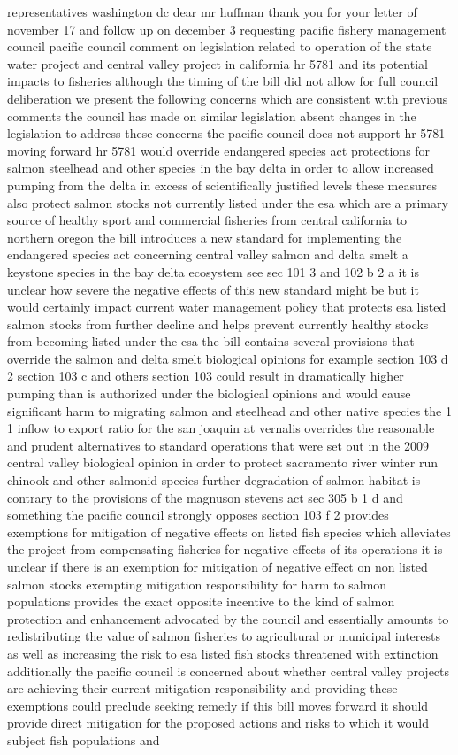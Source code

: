 \documentclass{article}
\begin{document}
representatives washington dc dear mr huffman thank you for your letter of november 17 and follow up on december 3 requesting pacific fishery management council pacific council comment on legislation related to operation of the state water project and central valley project in california hr 5781 and its potential impacts to fisheries although the timing of the bill did not allow for full council deliberation we present the following concerns which are consistent with previous comments the council has made on similar legislation absent changes in the legislation to address these concerns the pacific council does not support hr 5781 moving forward hr 5781 would override endangered species act protections for salmon steelhead and other species in the bay delta in order to allow increased pumping from the delta in excess of scientifically justified levels these measures also protect salmon stocks not currently listed under the esa which are a primary source of healthy sport and commercial fisheries from central california to northern oregon the bill introduces a new standard for implementing the endangered species act concerning central valley salmon and delta smelt a keystone species in the bay delta ecosystem see sec 101 3 and 102 b 2 a it is unclear how severe the negative effects of this new standard might be but it would certainly impact current water management policy that protects esa listed salmon stocks from further decline and helps prevent currently healthy stocks from becoming listed under the esa the bill contains several provisions that override the salmon and delta smelt biological opinions for example section 103 d 2 section 103 c and others section 103 could result in dramatically higher pumping than is authorized under the biological opinions and would cause significant harm to migrating salmon and steelhead and other native species the 1 1 inflow to export ratio for the san joaquin at vernalis overrides the reasonable and prudent alternatives to standard operations that were set out in the 2009 central valley biological opinion in order to protect sacramento river winter run chinook and other salmonid species further degradation of salmon habitat is contrary to the provisions of the magnuson stevens act sec 305 b 1 d and something the pacific council strongly opposes section 103 f 2 provides exemptions for mitigation of negative effects on listed fish species which alleviates the project from compensating fisheries for negative effects of its operations it is unclear if there is an exemption for mitigation of negative effect on non listed salmon stocks exempting mitigation responsibility for harm to salmon populations provides the exact opposite incentive to the kind of salmon protection and enhancement advocated by the council and essentially amounts to redistributing the value of salmon fisheries to agricultural or municipal interests as well as increasing the risk to esa listed fish stocks threatened with extinction additionally the pacific council is concerned about whether central valley projects are achieving their current mitigation responsibility and providing these exemptions could preclude seeking remedy if this bill moves forward it should provide direct mitigation for the proposed actions and risks to which it would subject fish populations and 
\end{document}
